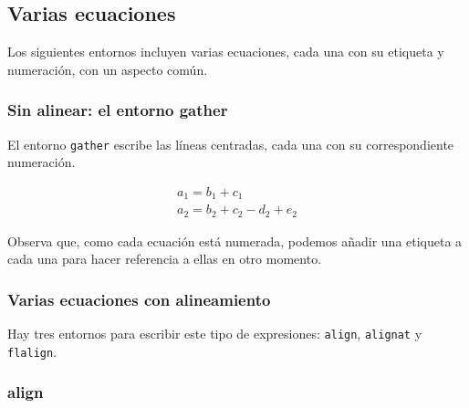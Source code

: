 \documentclass{article}
\numberwithin{equation}{section}
\theoremstyle{plain}
\theoremstyle{definition}
\theoremstyle{remark}
\begin{document}
\subsection{Varias ecuaciones}

Los siguientes entornos incluyen varias ecuaciones, cada una con su etiqueta y numeración, con un aspecto común.

\subsubsection{Sin alinear: el entorno gather}

El entorno \texttt{gather} escribe las líneas centradas, cada una con su correspondiente numeración.
\begin{codigo-lado}
\begin{gather}
a_1 = b_1 + c_1 \label{eq:gather1}\\
a_2 = b_2 + c_2 - d_2 + e_2 \label{eq:gather2}
\end{gather}
\end{codigo-lado}
Observa que, como cada ecuación está numerada, podemos añadir una etiqueta a cada una para hacer referencia a ellas en otro momento.

\subsubsection{Varias ecuaciones con alineamiento}

Hay tres entornos para escribir este tipo de expresiones: \texttt{align}, \texttt{alignat} y \texttt{flalign}. 

\subsubsection{align}
\end{document}
